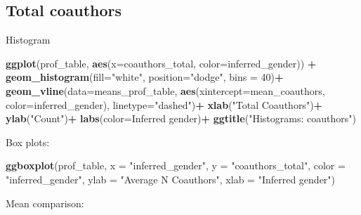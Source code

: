 \documentclass[
]{article}
\newenvironment{Shaded}{\begin{snugshade}}{\end{snugshade}}
\newcommand{\AttributeTok}[1]{\textcolor[rgb]{0.13,0.29,0.53}{#1}}
\newcommand{\DecValTok}[1]{\textcolor[rgb]{0.00,0.00,0.81}{#1}}
\newcommand{\FunctionTok}[1]{\textcolor[rgb]{0.13,0.29,0.53}{\textbf{#1}}}
\newcommand{\NormalTok}[1]{#1}
\newcommand{\SpecialCharTok}[1]{\textcolor[rgb]{0.81,0.36,0.00}{\textbf{#1}}}
\newcommand{\StringTok}[1]{\textcolor[rgb]{0.31,0.60,0.02}{#1}}
\begin{document}
\hypertarget{total-coauthors}{%
\subsection{Total coauthors}\label{total-coauthors}}

Histogram

\begin{Shaded}
\begin{Highlighting}[]
\FunctionTok{ggplot}\NormalTok{(prof\_table, }\FunctionTok{aes}\NormalTok{(}\AttributeTok{x=}\NormalTok{coauthors\_total, }\AttributeTok{color=}\NormalTok{inferred\_gender)) }\SpecialCharTok{+}
  \FunctionTok{geom\_histogram}\NormalTok{(}\AttributeTok{fill=}\StringTok{"white"}\NormalTok{, }\AttributeTok{position=}\StringTok{"dodge"}\NormalTok{, }\AttributeTok{bins =} \DecValTok{40}\NormalTok{)}\SpecialCharTok{+}
  \FunctionTok{geom\_vline}\NormalTok{(}\AttributeTok{data=}\NormalTok{means\_prof\_table, }\FunctionTok{aes}\NormalTok{(}\AttributeTok{xintercept=}\NormalTok{mean\_coauthors, }\AttributeTok{color=}\NormalTok{inferred\_gender),}
             \AttributeTok{linetype=}\StringTok{"dashed"}\NormalTok{)}\SpecialCharTok{+}
  \FunctionTok{xlab}\NormalTok{(}\StringTok{"Total Coauthors"}\NormalTok{)}\SpecialCharTok{+}
  \FunctionTok{ylab}\NormalTok{(}\StringTok{"Count"}\NormalTok{)}\SpecialCharTok{+}
  \FunctionTok{labs}\NormalTok{(}\AttributeTok{color=}\StringTok{\textquotesingle{}Inferred gender\textquotesingle{}}\NormalTok{)}\SpecialCharTok{+}
  \FunctionTok{ggtitle}\NormalTok{(}\StringTok{"Histograms: coauthors"}\NormalTok{)}
\end{Highlighting}
\end{Shaded}

Box plots:

\begin{Shaded}
\begin{Highlighting}[]
\FunctionTok{ggboxplot}\NormalTok{(prof\_table, }\AttributeTok{x =} \StringTok{"inferred\_gender"}\NormalTok{, }\AttributeTok{y =} \StringTok{"coauthors\_total"}\NormalTok{, }
          \AttributeTok{color =} \StringTok{"inferred\_gender"}\NormalTok{, }
          \AttributeTok{ylab =} \StringTok{"Average N Coauthors"}\NormalTok{, }\AttributeTok{xlab =} \StringTok{"Inferred gender"}\NormalTok{)}
\end{Highlighting}
\end{Shaded}

Mean comparison:

\begin{Shaded}
\end{Shaded}
\end{document}
